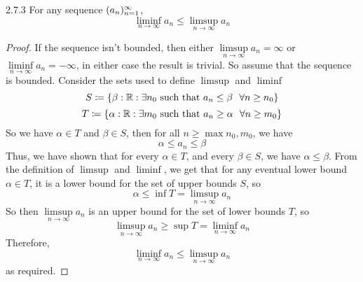 \documentclass[openany]{report}
\begin{document}
    \begin{manualprop}{2.7.3}
        For any sequence $({a}_n)_{n=1}^\infty$,
        \[\liminf_{n\rightarrow\infty} a_n \leq \limsup_{n\rightarrow \infty} a_n\]
    \end{manualprop}
    \begin{proof}
        If the sequence isn't bounded, then either $\limsup\limits_{n\rightarrow\infty}a_n = \infty$ or $\liminf\limits_{n\rightarrow\infty} a_n = -\infty$, in either case the result is trivial. So assume that the sequence is bounded. Consider the sets used to define $\limsup$ and $\liminf$
        \[S \coloneqq \{\beta : \mathbb{R} : \exists n_0 \text{ such that } a_n \leq \beta \ \  \forall n \geq n_0\}\]
        \[T \coloneqq \{\alpha : \mathbb{R} : \exists m_0 \text{ such that } a_n \geq \alpha \ \ \forall n \geq m_0\}\]
        So we have $\alpha \in T$ and $\beta \in S$, then for all $n \geq \max{n_0, m_0}$, we have
        \[\alpha \leq a_n \leq \beta\]
        Thus, we have shown that for every $\alpha \in T$, and every $\beta \in S$, we have $\alpha \leq \beta$. From the definition of $\limsup$ and $\liminf$, we get that for any eventual lower bound $\alpha \in T$, it is a lower bound for the set of upper bounds $S$, so
        \[\alpha \leq \inf T = \limsup_{n\rightarrow\infty} a_n \]
        So then $\limsup\limits_{n\rightarrow\infty}a_n$ is an upper bound for the set of lower bounds $T$, so
        \[\limsup_{n\rightarrow\infty} a_n \geq \sup T = \liminf_{n\rightarrow\infty} a_n\]
        Therefore, 
        \[\liminf_{n\rightarrow\infty} a_n \leq \limsup_{n\rightarrow\infty} a_n\]
        as required.


    \end{proof}
\end{document}
